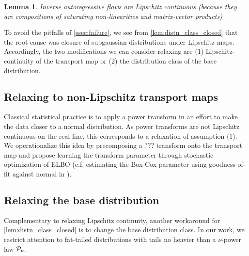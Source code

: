 \documentclass{scrartcl}
\newtheorem{claim}{Lemma}
\theoremstyle{definition}
\begin{document}
\begin{claim}
    Inverse autoregressive flows \cite{kingma2016improved} are Lipschitz continuous
    (because they are compositions of saturating non-linearities and matrix-vector products)
\end{claim}

To avoid the pitfalls of \cref{ssec:failure}, we see from
\cref{lem:distn_class_closed} that the root cause was closure of subgaussian
distributions under Lipschitz maps. Accordingly, the two modifications we can
consider relaxing are (1) Lipschitz-continuity of the transport map or (2)
the distribution class of the base distribution.

\subsection{Relaxing to non-Lipschitz transport maps}

Classical statistical practice is to apply a power transform in an effort to
make the data closer to a normal distribution. As power transforms are not
Lipschitz continuous on the real line, this corresponds to a relaxation of
assumption (1). We operationalize this idea by precomposing a ??? transform
onto the transport map and propose learning the transform parameter through
stochastic optimization of ELBO (c.f. estimating the Box-Cox parameter using
goodness-of-fit against normal in \cite{asar2017estimating}).



\subsection{Relaxing the base distribution}

Complementary to relaxing Lipschitz continuity, another workaround for
\cref{lem:distn_class_closed} is to change the base distribution class.
In our work, we restrict attention to fat-tailed distributions with
tails no heavier than a $\nu$-power law $\mathcal{P}_\nu$.
\end{document}
